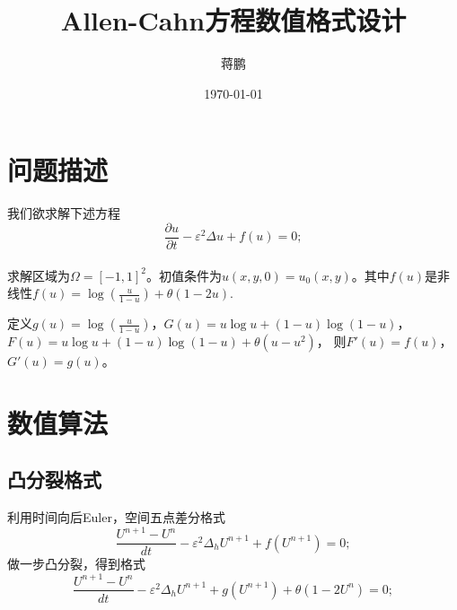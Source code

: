 \documentclass[11pt,a4 paper,one side]{article}
\title{Allen-Cahn方程数值格式设计}
\date{\today}
\author{蒋鹏}
\begin{document}
\maketitle
\tableofcontents
\section{问题描述}
我们欲求解下述方程\begin{equation}
    \frac{\partial u}{\partial t}- \varepsilon^2 \Delta u + f(u) = 0;
\end{equation}
\\ 求解区域为$\Omega = [-1,1]^2$。初值条件为$u(x,y,0) = u_0(x,y)$。其中$f(u)$是非线性$f(u) = \log{(\frac{u}{1-u})}+\theta (1-2u) $.
\par 定义$g(u) = \log{(\frac{u}{1-u})}$，$G(u) = u\log{u}+(1-u)\log{(1-u)}$，$F(u) = u\log{u}+(1-u)\log{(1-u)}+\theta (u-u^2)$，
则$F'(u)=f(u)$，$G'(u)=g(u)$。
\section{数值算法}
\subsection{凸分裂格式}

利用时间向后Euler，空间五点差分格式 \begin{equation}
    \frac{U^{n+1}-U^n}{dt} - \varepsilon^2 \Delta_h U^{n+1} + f(U^{n+1})=0;
\end{equation}
做一步凸分裂，得到格式\begin{equation}
    \frac{U^{n+1}-U^n}{dt} - \varepsilon^2 \Delta_h U^{n+1} + g(U^{n+1}) +\theta (1-2U^n)=0;
\end{equation}
\end{document}
